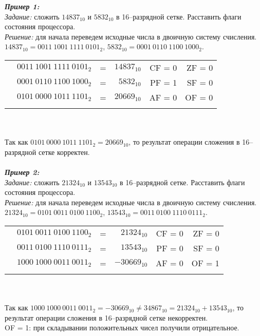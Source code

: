 \emph{\textbf{Пример 1:}}
\\\emph{Задание:} сложить $14837_{10}$ и $5832_{10}$ в 16--разрядной сетке. Расставить флаги состояния процессора.
\\\emph{Решение:} для начала переведем исходные числа в двоичную систему счисления. $14837_{10} = 0011\ 1001\ 1111\ 0101_{2}$, $5832_{10} = 0001\ 0110\ 1100\ 1000_{2}$.
\\
\begin{minipage}[c]{10cm}
\begin{tabular}{r l c r | r r |}
\\
\hhline{~~~~----}
\multirow{2}{*}{+} & $0011\ 1001\ 1111\ 0101_{2}$ & = & $14837_{10}$ & CF = 0 & ZF = 0
\\ & $0001\ 0110\ 1100\ 1000_{2}$ & = & $5832_{10}$ &  PF = 1 & SF = 0
\\ \hhline{~--~~~}
 & $0101\ 0000\ 1011\ 1101_{2}$ & = & $20669_{10}$ & AF = 0 & OF = 0
\\\hhline{~~~~----}
\end{tabular}
\end{minipage}
\\
\\Так как $0101\ 0000\ 1011\ 1101_{2} = 20669_{10}$, то результат операции сложения в 16--разрядной сетке корректен.
\\
\\\emph{\textbf{Пример 2:}}
\\\emph{Задание:} сложить $21324_{10}$ и $13543_{10}$ в 16--разрядной сетке. Расставить флаги состояния процессора.
\\\emph{Решение:} для начала переведем исходные числа в двоичную систему счисления. $21324_{10} = 0101\ 0011\ 0100\ 1100_{2}$, $13543_{10} = 0011\ 0100\ 1110\ 0111_{2}$.
\\
\begin{minipage}[c]{10cm}
\begin{tabular}{r l c r | r r |}
\\
\hhline{~~~~----}
\multirow{2}{*}{+} & $0101\ 0011\ 0100\ 1100_{2}$ & = & $21324_{10}$ & CF = 0 & ZF = 0
\\ & $0011\ 0100\ 1110\ 0111_{2}$ & = & $13543_{10}$ &  PF = 0 & SF = 0
\\ \hhline{~--~~~}
 & $1000\ 1000\ 0011\ 0011_{2}$ & = & $-30669_{10}$ & AF = 0 & OF = 1
\\\hhline{~~~~----}
\end{tabular}
\end{minipage}
\\
\\Так как $1000\ 1000\ 0011\ 0011_{2} = -30669_{10} \ne 34867_{10} = 21324_{10} + 13543_{10}$, то результат операции сложения в 16--разрядной сетке некорректен. \\OF = 1: при складывании положительных чисел получили отрицательное.
